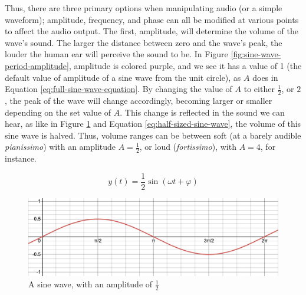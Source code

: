 Thus, there are three primary options when manipulating audio (or a simple waveform); amplitude, frequency, and phase can all be modified at various points to affect the audio output. The first, amplitude, will determine the volume of the wave's sound. The larger the distance between zero and the wave's peak, the louder the human ear will perceive the sound to be\cite{Zjalic_2021}. In Figure \ref{fig:sine-wave-period-amplitude}, amplitude is colored purple, and we see it has a value of 1 (the default value of amplitude of a sine wave from the unit circle), as $A$ does in Equation \ref{eq:full-sine-wave-equation}. By changing the value of $A$ to either $\frac{1}{2}$, or $2$, the peak of the wave will change accordingly, becoming larger or smaller depending on the set value of $A$. This change is reflected in the sound we can hear, as like in Figure \ref{fig:half-sized-sine-wave} and Equation \ref{eq:half-sized-sine-wave}, the volume of this sine wave is halved. Thus, volume ranges can be between soft (at a barely audible \textit{pianissimo}) with an amplitude $A = \frac{1}{2}$, or loud (\textit{fortissimo}), with $A = 4$, for instance.

\begin{equation}\label{eq:half-sized-sine-wave}
	y(t) = \frac{1}{2} \sin(\omega t + \varphi)
\end{equation}

\begin{figure}
	\centering
	\includegraphics[width=\textwidth]{figures/half-sized-sine-wave.png}
	\caption{A sine wave, with an amplitude of $\frac{1}{2}$}
	\label{fig:half-sized-sine-wave}
\end{figure}

